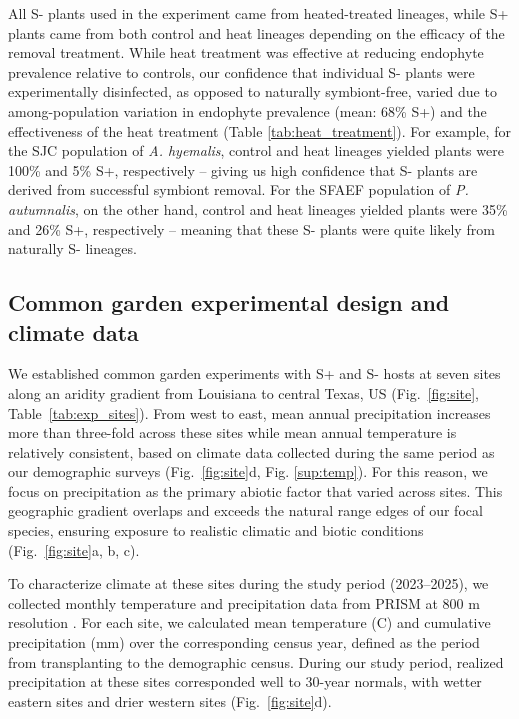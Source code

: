 \documentclass[12pt]{article}\usepackage[]{graphicx}\usepackage[dvipsnames]{xcolor}
\begin{document}
All S- plants used in the experiment came from heated-treated lineages, while S+ plants came from both control and heat lineages depending on the efficacy of the removal treatment. 
While heat treatment was effective at reducing endophyte prevalence relative to controls, our confidence that individual S- plants were experimentally disinfected, as opposed to naturally symbiont-free, varied due to among-population variation in endophyte prevalence (mean: 68\% S+) and the effectiveness of the heat treatment (Table \ref{tab:heat_treatment}). 
For example, for the SJC population of \emph{A. hyemalis}, control and heat lineages yielded plants were 100\% and 5\% S+, respectively -- giving us high confidence that S- plants are derived from successful symbiont removal. 
For the SFAEF population of \emph{P. autumnalis}, on the other hand, control and heat lineages yielded plants were 35\% and 26\% S+, respectively -- meaning that these S- plants were quite likely from naturally S- lineages.

\subsection*{Common garden experimental design and climate data}
We established common garden experiments with S+ and S- hosts at seven sites along an aridity gradient from Louisiana to central Texas, US (Fig.~\ref{fig:site}, Table~\ref{tab:exp_sites}).
From west to east, mean annual precipitation increases more than three-fold across these sites while mean annual temperature is relatively consistent, based on climate data collected during the same period as our demographic surveys (Fig.~\ref{fig:site}d, Fig. \ref{sup:temp}).
For this reason, we focus on precipitation as the primary abiotic factor that varied across sites.  
This geographic gradient overlaps and exceeds the natural range edges of our focal species, ensuring exposure to realistic climatic and biotic conditions (Fig.~\ref{fig:site}a, b, c). 

To characterize climate at these sites during the study period (2023–2025), we collected monthly temperature and precipitation data from PRISM at 800 m resolution \citep{PRISM2024}. 
For each site, we calculated mean temperature (\textdegree C) and cumulative precipitation (mm) over the corresponding census year, defined as the period from transplanting to the demographic census.
During our study period, realized precipitation at these sites corresponded well to 30-year normals, with wetter eastern sites and drier western sites (Fig.~\ref{fig:site}d).
\end{document}
